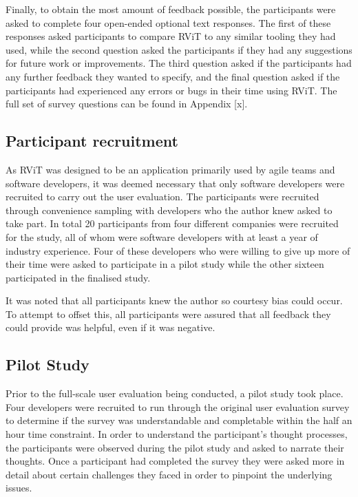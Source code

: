 \documentclass[l4proj.tex]{subfiles}
\begin{document}
Finally, to obtain the most amount of feedback possible, the participants were asked to complete four open-ended optional text responses. The first of these responses asked participants to compare RViT to any similar tooling they had used, while the second question asked the participants if they had any suggestions for future work or improvements. The third question asked if the participants had any further feedback they wanted to specify, and the final question asked if the participants had experienced any errors or bugs in their time using RViT. The full set of survey questions can be found in Appendix [x].


\subsection{Participant recruitment}
As RViT was designed to be an application primarily used by agile teams and software developers, it was deemed necessary that only software developers were recruited to carry out the user evaluation. The participants were recruited through convenience sampling with developers who the author knew asked to take part. In total 20 participants from four different companies were recruited for the study, all of whom were software developers with at least a year of industry experience. Four of these developers who were willing to give up more of their time were asked to participate in a pilot study while the other sixteen participated in the finalised study.

It was noted that all participants knew the author so courtesy bias could occur. To attempt to offset this, all participants were assured that all feedback they could provide was helpful, even if it was negative.


\subsection{Pilot Study}
Prior to the full-scale user evaluation being conducted, a pilot study took place. Four developers were recruited to run through the original user evaluation survey to determine if the survey was understandable and completable within the half an hour time constraint. In order to understand the participant's thought processes, the participants were observed during the pilot study and asked to narrate their thoughts. Once a participant had completed the survey they were asked more in detail about certain challenges they faced in order to pinpoint the underlying issues. 
\end{document}
